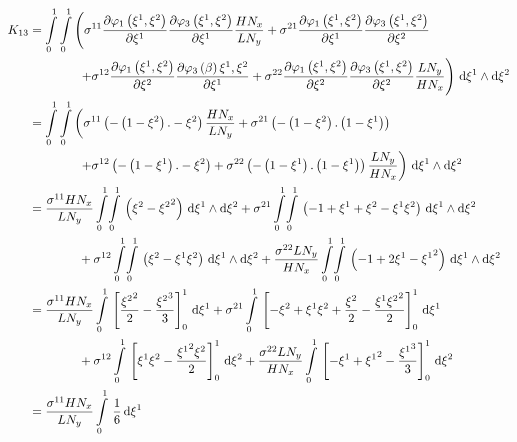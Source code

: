 \begin{equation}
  \begin{aligned}
    K_{13}&=\dintl{0}{1}\dintl{0}{1}\left(
    \conductivitytensorsymbol^{11}\delby{\lbfn{1}{\xione,\xitwo}}{\xione}
    \delby{\lbfn{3}{\xione,\xitwo}}{\xione}\dfrac{H N_{x}}{L N_{y}}+
    \conductivitytensorsymbol^{21}\delby{\lbfn{1}{\xione,\xitwo}}{\xione}
    \delby{\lbfn{3}{\xione,\xitwo}}{\xitwo}\right.\\
    &\qquad\qquad\left.+\conductivitytensorsymbol^{12}\delby{\lbfn{1}{\xione,\xitwo}}{\xitwo}
    \delby{\lbfn{3}{\beta}{\xione,\xitwo}}{\xione}+
    \conductivitytensorsymbol^{22}\delby{\lbfn{1}{\xione,\xitwo}}{\xitwo}
    \delby{\lbfn{3}{\xione,\xitwo}}{\xitwo}\dfrac{L N_{y}}{H N_{x}}\right)\infinitesimaltwo{\xione}{\xitwo}\\
    &=\dintl{0}{1}\dintl{0}{1}\left(
    \conductivitytensorsymbol^{11}\pbrac{-\pbrac{1-\xitwo}.-\xitwo}\dfrac{H N_{x}}{L N_{y}}+
    \conductivitytensorsymbol^{21}\pbrac{-\pbrac{1-\xitwo}.\pbrac{1-\xione}}\right.\\
    &\qquad\qquad\left.+\conductivitytensorsymbol^{12}\pbrac{-\pbrac{1-\xione}.-\xitwo}+
    \conductivitytensorsymbol^{22}\pbrac{-\pbrac{1-\xione}.\pbrac{1-\xione}}\dfrac{L N_{y}}{H N_{x}}\right)
    \infinitesimaltwo{\xione}{\xitwo}\\
    &=\dfrac{\conductivitytensorsymbol^{11} H N_{x}}{L N_{y}}\giint{0}{1}{0}{1}{\pbrac{\xitwo-\xitwosq}}{\xione}{\xitwo}
    +\conductivitytensorsymbol^{21}\giint{0}{1}{0}{1}{\pbrac{-1+\xione+\xitwo-\xione\xitwo}}{\xione}{\xitwo}\\
    &\qquad\qquad+\conductivitytensorsymbol^{12}\giint{0}{1}{0}{1}{\pbrac{\xitwo-\xione\xitwo}}{\xione}{\xitwo}
    +\dfrac{\conductivitytensorsymbol^{22} L N_{y}}{H N_{x}}\giint{0}{1}{0}{1}{\pbrac{-1+2\xione-\xionesq}}{\xione}{\xitwo} \\
    &=\dfrac{\conductivitytensorsymbol^{11} H N_{x}}{L N_{y}}\gint{0}{1}{\sqbrac{\dfrac{\xitwosq}{2}-\dfrac{\xitwocube}{3}}^{1}_{0}}{\xione}
    +\conductivitytensorsymbol^{21}\gint{0}{1}{\sqbrac{-\xitwo+\xione\xitwo+\dfrac{\xitwo}{2}-\dfrac{\xione\xitwosq}{2}}^{1}_{0}}{\xione}\\
    &\qquad\qquad+\conductivitytensorsymbol^{12}\gint{0}{1}{\sqbrac{\xione\xitwo-\dfrac{\xionesq\xitwo}{2}}^{1}_{0}}{\xitwo}
    +\dfrac{\conductivitytensorsymbol^{22} L N_{y}}{H N_{x}}\gint{0}{1}{\sqbrac{-\xione+\xionesq-\dfrac{\xionecube}{3}}^{1}_{0}}{\xitwo} \\
    &=\dfrac{\conductivitytensorsymbol^{11} H N_{x}}{L N_{y}}\gint{0}{1}{\dfrac{1}{6}}{\xione}

\end{aligned}
\end{equation}
